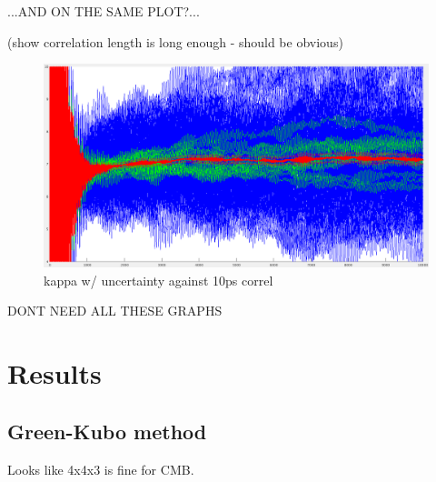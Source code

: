 \documentclass[%
preprint,                                  %
nofootinbib,
 amsmath,amssymb,
 aps,
]{revtex4-1}
\begin{document}
...AND ON THE SAME PLOT?...

(show correlation length is long enough - should be obvious)

\begin{figure}[h!]
  \includegraphics[width=\linewidth]{images/6x6x4_01-z-stddev_2-10ps.png}
  \caption{kappa w/ uncertainty against 10ps correl}
  \label{fig:664z_10ps}
\end{figure}

DONT NEED ALL THESE GRAPHS















\section{\label{sec:results}Results}

\subsection{\label{sec:results.gk}Green-Kubo method}

Looks like 4x4x3 is fine for CMB.
\end{document}

